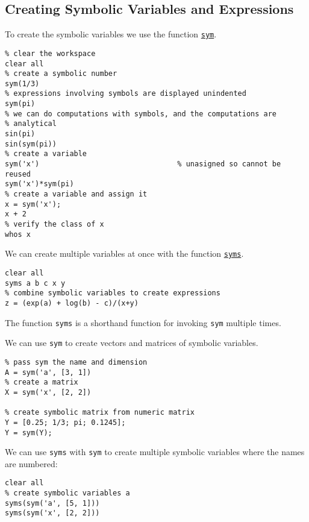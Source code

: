 \documentclass[12pt, a4paper]{article}
\begin{document}
\subsection{Creating Symbolic Variables and Expressions}
\label{sec:orga4b404e}
To create the symbolic variables we use the function \href{https://www.mathworks.com/help/symbolic/sym.html}{\texttt{sym}}.
\lstset{language=matlab,label= ,caption= ,captionpos=b,firstnumber=1,numbers=left,style=Matlab-editor}
\begin{lstlisting}
% clear the workspace
clear all
% create a symbolic number
sym(1/3)
% expressions involving symbols are displayed unindented
sym(pi)
% we can do computations with symbols, and the computations are
% analytical
sin(pi)
sin(sym(pi))
% create a variable
sym('x')                                % unasigned so cannot be reused
sym('x')*sym(pi)
% create a variable and assign it
x = sym('x');
x + 2
% verify the class of x
whos x
\end{lstlisting}
We can create multiple variables at once with the function \href{https://www.mathworks.com/help/symbolic/syms.html}{\texttt{syms}}.
\lstset{language=matlab,label= ,caption= ,captionpos=b,firstnumber=1,numbers=left,style=Matlab-editor}
\begin{lstlisting}
clear all
syms a b c x y
% combine symbolic variables to create expressions
z = (exp(a) + log(b) - c)/(x+y)
\end{lstlisting}
The function \texttt{syms} is a shorthand function for invoking \texttt{sym} multiple times.

We can use \texttt{sym} to create vectors and matrices of symbolic variables.
\lstset{language=matlab,label= ,caption= ,captionpos=b,firstnumber=1,numbers=left,style=Matlab-editor}
\begin{lstlisting}
% pass sym the name and dimension
A = sym('a', [3, 1])
% create a matrix
X = sym('x', [2, 2])

% create symbolic matrix from numeric matrix
Y = [0.25; 1/3; pi; 0.1245];
Y = sym(Y);
\end{lstlisting}

We can use \texttt{syms} with \texttt{sym} to create multiple symbolic variables where the names are numbered:
\lstset{language=matlab,label= ,caption= ,captionpos=b,firstnumber=1,numbers=left,style=Matlab-editor}
\begin{lstlisting}
clear all
% create symbolic variables a
syms(sym('a', [5, 1]))
syms(sym('x', [2, 2]))
\end{lstlisting}
\end{document}
